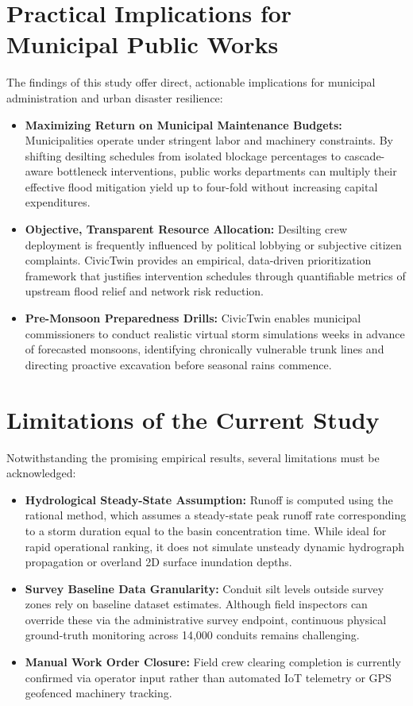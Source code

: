 \documentclass[12pt,a4paper]{report}
\begin{document}
\section{Practical Implications for Municipal Public Works}
The findings of this study offer direct, actionable implications for municipal administration and urban disaster resilience:
\begin{itemize}
    \item \textbf{Maximizing Return on Municipal Maintenance Budgets:} Municipalities operate under stringent labor and machinery constraints. By shifting desilting schedules from isolated blockage percentages to cascade-aware bottleneck interventions, public works departments can multiply their effective flood mitigation yield up to four-fold without increasing capital expenditures.
    \item \textbf{Objective, Transparent Resource Allocation:} Desilting crew deployment is frequently influenced by political lobbying or subjective citizen complaints. CivicTwin provides an empirical, data-driven prioritization framework that justifies intervention schedules through quantifiable metrics of upstream flood relief and network risk reduction.
    \item \textbf{Pre-Monsoon Preparedness Drills:} CivicTwin enables municipal commissioners to conduct realistic virtual storm simulations weeks in advance of forecasted monsoons, identifying chronically vulnerable trunk lines and directing proactive excavation before seasonal rains commence.
\end{itemize}

\section{Limitations of the Current Study}
Notwithstanding the promising empirical results, several limitations must be acknowledged:
\begin{itemize}
    \item \textbf{Hydrological Steady-State Assumption:} Runoff is computed using the rational method, which assumes a steady-state peak runoff rate corresponding to a storm duration equal to the basin concentration time. While ideal for rapid operational ranking, it does not simulate unsteady dynamic hydrograph propagation or overland 2D surface inundation depths.
    \item \textbf{Survey Baseline Data Granularity:} Conduit silt levels outside survey zones rely on baseline dataset estimates. Although field inspectors can override these via the administrative survey endpoint, continuous physical ground-truth monitoring across 14,000 conduits remains challenging.
    \item \textbf{Manual Work Order Closure:} Field crew clearing completion is currently confirmed via operator input rather than automated IoT telemetry or GPS geofenced machinery tracking.
\end{itemize}
\end{document}
